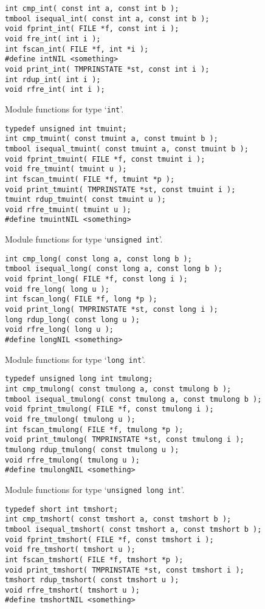 \begin{verbatim}
int cmp_int( const int a, const int b );
tmbool isequal_int( const int a, const int b );
void fprint_int( FILE *f, const int i );
void fre_int( int i );
int fscan_int( FILE *f, int *i );
#define intNIL <something>
void print_int( TMPRINSTATE *st, const int i );
int rdup_int( int i );
void rfre_int( int i );
\end{verbatim}
\begin{desc}
Module functions for type `{\tt int}'.
\end{desc}
\begin{verbatim}
typedef unsigned int tmuint;
int cmp_tmuint( const tmuint a, const tmuint b );
tmbool isequal_tmuint( const tmuint a, const tmuint b );
void fprint_tmuint( FILE *f, const tmuint i );
void fre_tmuint( tmuint u );
int fscan_tmuint( FILE *f, tmuint *p );
void print_tmuint( TMPRINSTATE *st, const tmuint i );
tmuint rdup_tmuint( const tmuint u );
void rfre_tmuint( tmuint u );
#define tmuintNIL <something>
\end{verbatim}
\begin{desc}
Module functions for type `{\tt unsigned int}'.
\end{desc}
\begin{verbatim}
int cmp_long( const long a, const long b );
tmbool isequal_long( const long a, const long b );
void fprint_long( FILE *f, const long i );
void fre_long( long u );
int fscan_long( FILE *f, long *p );
void print_long( TMPRINSTATE *st, const long i );
long rdup_long( const long u );
void rfre_long( long u );
#define longNIL <something>
\end{verbatim}
\begin{desc}
Module functions for type `{\tt long int}'.
\end{desc}
\begin{verbatim}
typedef unsigned long int tmulong;
int cmp_tmulong( const tmulong a, const tmulong b );
tmbool isequal_tmulong( const tmulong a, const tmulong b );
void fprint_tmulong( FILE *f, const tmulong i );
void fre_tmulong( tmulong u );
int fscan_tmulong( FILE *f, tmulong *p );
void print_tmulong( TMPRINSTATE *st, const tmulong i );
tmulong rdup_tmulong( const tmulong u );
void rfre_tmulong( tmulong u );
#define tmulongNIL <something>
\end{verbatim}
\begin{desc}
Module functions for type `{\tt unsigned long int}'.
\end{desc}
\begin{verbatim}
typedef short int tmshort;
int cmp_tmshort( const tmshort a, const tmshort b );
tmbool isequal_tmshort( const tmshort a, const tmshort b );
void fprint_tmshort( FILE *f, const tmshort i );
void fre_tmshort( tmshort u );
int fscan_tmshort( FILE *f, tmshort *p );
void print_tmshort( TMPRINSTATE *st, const tmshort i );
tmshort rdup_tmshort( const tmshort u );
void rfre_tmshort( tmshort u );
#define tmshortNIL <something>
\end{verbatim}
